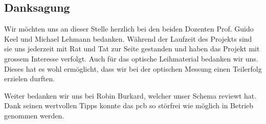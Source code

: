 \subsection{Danksagung}
Wir möchten uns an dieser Stelle herzlich bei den beiden Dozenten Prof. Guido Keel und Michael Lehmann bedanken. Während
der Laufzeit des Projekts sind sie uns jederzeit mit Rat und Tat zur Seite gestanden und haben das Projekt mit grossem
Interesse verfolgt. Auch für das optische Leihmaterial bedanken wir uns. Dieses hat es wohl ermöglicht, dass wir bei der
optischen Messung einen Teilerfolg erzielen durften.

Weiter bedanken wir uns bei Robin Burkard, welcher unser Schema reviewt hat. Dank seinen wertvollen Tipps konnte das
\acrshort{pcb} so störfrei wie möglich in Betrieb genommen werden.
